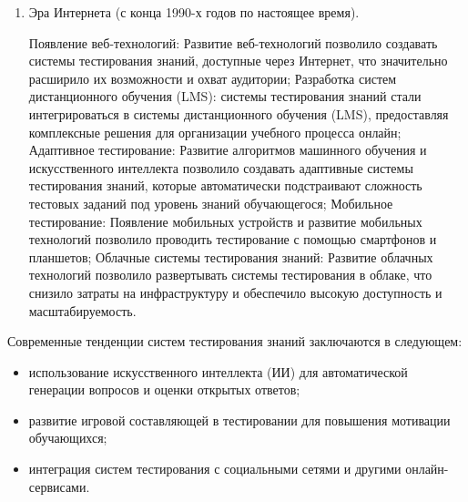 \begin{enumerate}
	\item Эра Интернета (с конца 1990-х годов по настоящее время).
	
	Появление веб-технологий: Развитие веб-технологий позволило создавать системы тестирования знаний, доступные через Интернет, что значительно расширило их возможности и охват аудитории;
	Разработка систем дистанционного обучения (LMS): системы тестирования знаний стали интегрироваться в системы дистанционного обучения (LMS), предоставляя комплексные решения для организации учебного процесса онлайн;
	Адаптивное тестирование: Развитие алгоритмов машинного обучения и искусственного интеллекта позволило создавать адаптивные системы тестирования знаний, которые автоматически подстраивают сложность тестовых заданий под уровень знаний обучающегося;
	Мобильное тестирование: Появление мобильных устройств и развитие мобильных технологий позволило проводить тестирование с помощью смартфонов и планшетов;
	Облачные системы тестирования знаний: Развитие облачных технологий позволило развертывать системы тестирования в облаке, что снизило затраты на инфраструктуру и обеспечило высокую доступность и масштабируемость.
\end{enumerate}

Современные тенденции систем тестирования знаний заключаются в следующем:
\begin{itemize}
	\item использование искусственного интеллекта (ИИ) для автоматической генерации вопросов и оценки открытых ответов;
	\item развитие игровой составляющей в тестировании для повышения мотивации обучающихся;
	\item интеграция систем тестирования с социальными сетями и другими онлайн-сервисами.
\end{itemize} 